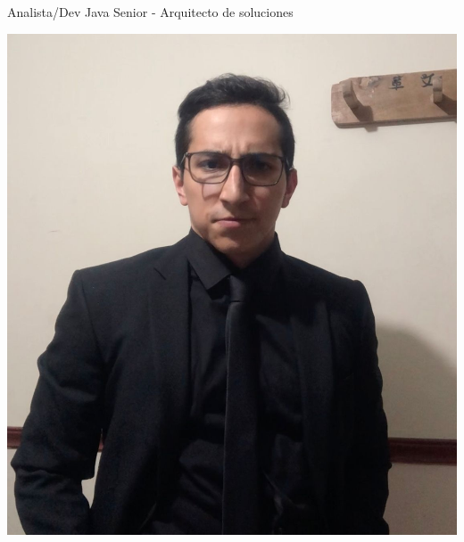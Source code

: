 \documentclass[]{cv-class}
\begin{document}
{Analista/Dev Java Senior - Arquitecto de soluciones }

\vspace{1.15cm}

\begin{aside}
	\includegraphics[scale=0.10]{img/indice.jpeg}
	~
	\vspace{0.35cm}

\end{aside}
\end{document}
